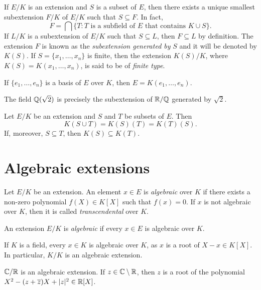 If $E/K$ is an extension and $S$ is a subset of $E$, then
there exists a unique smallest 
subextension $F/K$ of $E/K$ such that
$S\subseteq F$. In fact, 
\[
	F=\bigcap\{T:\text{$T$ is a subfield of $E$ that contains $K\cup S$}\}.
\]
If $L/K$ is a subextension of $E/K$ such that 
$S\subseteq L$, then $F\subseteq L$ by definition. The 
extension $F$ is known as the \emph{subextension generated by}
$S$ and
it will be denoted by $K(S)$. 
If $S=\{x_1,\dots,x_n\}$ is finite,
then the extension $K(S)/K$, where 
$K(S)=K(x_1,\dots,x_n)$, is said to be of \emph{finite type}. 

\begin{example}
	If $\{e_1,\dots,e_n\}$ is a basis of $E$ over $K$, 
	then $E=K(e_1,\dots,e_n)$. 
\end{example}

\begin{example}
	The field $\mathbb{Q}(\sqrt{2})$ is precisely the subextension 
	of $\mathbb{R}/\mathbb{Q}$ generated by $\sqrt{2}$. 
\end{example}

Let $E/K$ be an extension and $S$ and $T$ be subsets of $E$.
Then 
\[
	K(S\cup T)=K(S)(T)=K(T)(S).
\]
If, moreover, 
$S\subseteq T$, then $K(S)\subseteq K(T)$. 

\section{Algebraic extensions}

\begin{definition}
	Let $E/K$ be an extension. An element $x\in E$
	is \emph{algebraic} over $K$ if there
	exists a non-zero polynomial 
	$f(X)\in K[X]$ such that $f(x)=0$. If $x$ is
	not algebraic over $K$, 
	then it is called \emph{transcendental} over $K$.
\end{definition}

\begin{definition}	
	An extension $E/K$ is \emph{algebraic} if 
	every $x\in E$ is algebraic over $K$. 
\end{definition}

If $K$ is a field, every $x\in K$ is algebraic over $K$,
as $x$ is a root of $X-x\in K[X]$. In particular, $K/K$ is
an algebraic extension. 

\begin{example}
	$\mathbb{C}/\mathbb{R}$ is an algebraic extension. If $z\in\mathbb{C}\setminus\mathbb{R}$, then
	$z$ is a root of the polynomial 
	$X^2-(z+\overline{z})X+|z|^2\in\mathbb{R}[X]$. 
\end{example}

